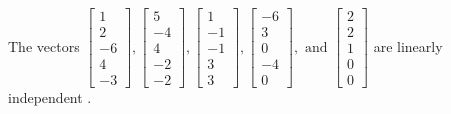 \begin{exercise}
\begin{exerciseStatement}
  \end{exerciseStatement}
  \begin{exerciseAnswer}
   The vectors \(\left[\begin{array}{r}
1 \\
2 \\
-6 \\
4 \\
-3
\end{array}\right] , \left[\begin{array}{r}
5 \\
-4 \\
4 \\
-2 \\
-2
\end{array}\right] , \left[\begin{array}{r}
1 \\
-1 \\
-1 \\
3 \\
3
\end{array}\right] , \left[\begin{array}{r}
-6 \\
3 \\
0 \\
-4 \\
0
\end{array}\right] , \text{ and } \left[\begin{array}{r}
2 \\
2 \\
1 \\
0 \\
0
\end{array}\right]\) are 
  	 linearly independent  .
  


  \end{exerciseAnswer}
\end{exercise}